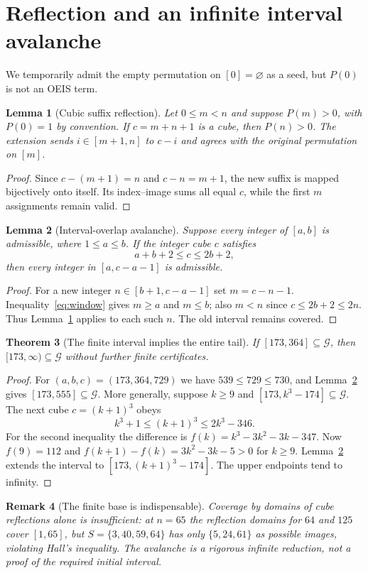 \documentclass[9pt]{extarticle}
\newtheorem{theorem}{Theorem}[section]
\newtheorem{lemma}[theorem]{Lemma}
\newtheorem{remark}[theorem]{Remark}
\newcommand{\G}{\mathcal G}
\begin{document}
\section{Reflection and an infinite interval avalanche}\label{sec:reflection}
We temporarily admit the empty permutation on $[0]=\varnothing$ as a seed, but $P(0)$ is not an OEIS term.
\begin{lemma}[Cubic suffix reflection]\label{lem:suffix}
Let $0\le m<n$ and suppose $P(m)>0$, with $P(0)=1$ by convention. If $c=m+n+1$ is a cube, then $P(n)>0$. The extension sends $i\in[m+1,n]$ to $c-i$ and agrees with the original permutation on $[m]$.
\end{lemma}
\begin{proof}
Since $c-(m+1)=n$ and $c-n=m+1$, the new suffix is mapped bijectively onto itself. Its index--image sums all equal $c$, while the first $m$ assignments remain valid.
\end{proof}
\begin{lemma}[Interval-overlap avalanche]\label{lem:avalanche}
Suppose every integer of $[a,b]$ is admissible, where $1\le a\le b$. If the integer cube $c$ satisfies
\begin{equation}\label{eq:window} a+b+2\le c\le2b+2,\end{equation}
then every integer in $[a,c-a-1]$ is admissible.
\end{lemma}
\begin{proof}
For a new integer $n\in[b+1,c-a-1]$ set $m=c-n-1$. Inequality~\eqref{eq:window} gives $m\ge a$ and $m\le b$; also $m<n$ since $c\le2b+2\le2n$. Thus Lemma~\ref{lem:suffix} applies to each such $n$. The old interval remains covered.
\end{proof}
\begin{theorem}[The finite interval implies the entire tail]\label{thm:tail}
If $[173,364]\subseteq\G$, then $[173,\infty)\subseteq\G$ without further finite certificates.
\end{theorem}
\begin{proof}
For $(a,b,c)=(173,364,729)$ we have $539\le729\le730$, and Lemma~\ref{lem:avalanche} gives $[173,555]\subseteq\G$. More generally, suppose $k\ge9$ and $[173,k^3-174]\subseteq\G$. The next cube $c=(k+1)^3$ obeys
\[
 k^3+1\le(k+1)^3\le2k^3-346.
\]
For the second inequality the difference is $f(k)=k^3-3k^2-3k-347$. Now $f(9)=112$ and $f(k+1)-f(k)=3k^2-3k-5>0$ for $k\ge9$. Lemma~\ref{lem:avalanche} extends the interval to $[173,(k+1)^3-174]$. The upper endpoints tend to infinity.
\end{proof}
\begin{remark}[The finite base is indispensable]
Coverage by domains of cube reflections alone is insufficient: at $n=65$ the reflection domains for $64$ and $125$ cover $[1,65]$, but $S=\{3,40,59,64\}$ has only $\{5,24,61\}$ as possible images, violating Hall's inequality. The avalanche is a rigorous infinite reduction, not a proof of the required initial interval.
\end{remark}
\end{document}
